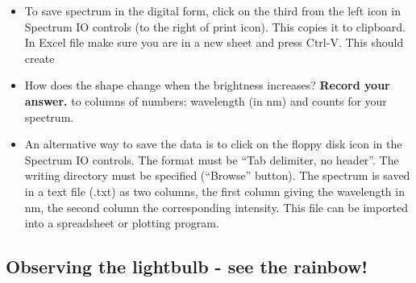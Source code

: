 \begin{itemize}
\begin{itemize}
	\item To save spectrum in the digital form, click on the third from the left icon in
	Spectrum IO controls (to the right of print icon). This copies it to clipboard. In
	Excel file make sure you are in a new sheet and press Ctrl-V. This should create\item How does the shape change when the brightness increases? \textbf{Record your answer.}
	to columns of numbers: wavelength (in nm) and counts for your spectrum.
	
	\item An alternative way to save the data is to click on the floppy disk icon in the
	Spectrum IO controls. The format must be ``Tab delimiter, no header''. The
	writing directory must be specified (``Browse'' button). The spectrum is saved in a
	text file (.txt) as two columns, the first column giving the wavelength in nm, the
	second column the corresponding intensity. This file can be imported into a spreadsheet or plotting program.
	\end{itemize}
\end{itemize}

\subsection{Observing the lightbulb - see the rainbow!}\label{ic:sec:exploring}

